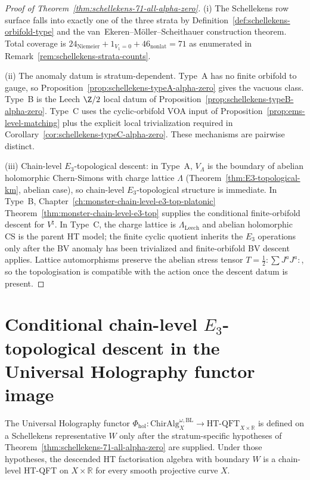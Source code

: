 \begin{proof}[Proof of Theorem~\ref{thm:schellekens-71-all-alpha-zero}]
(i) The Schellekens row surface falls into exactly one of the three
strata by Definition~\ref{def:schellekens-orbifold-type} and the
van~Ekeren--M\"oller--Scheithauer construction theorem. Total coverage is
$24_{\mathrm{Niemeier}} + 1_{V_1=0} + 46_{\mathrm{nonlat}} = 71$
as enumerated in
Remark~\ref{rem:schellekens-strata-counts}.

(ii) The anomaly datum is stratum-dependent. Type~A has no finite
orbifold to gauge, so Proposition~\ref{prop:schellekens-typeA-alpha-zero}
gives the vacuous class. Type~B is the Leech $\Z/2$ local datum of
Proposition~\ref{prop:schellekens-typeB-alpha-zero}. Type~C uses the
cyclic-orbifold VOA input of Proposition~\ref{prop:ems-level-matching}
plus the explicit local trivialization required in
Corollary~\ref{cor:schellekens-typeC-alpha-zero}. These mechanisms are
pairwise distinct.

(iii) Chain-level $E_3$-topological descent: in Type~A, $V_\Lambda$ is
the boundary of abelian holomorphic Chern-Simons with charge lattice
$\Lambda$ (Theorem~\ref*{thm:E3-topological-km}, abelian case),
so chain-level $E_3$-topological structure is immediate. In Type~B,
Chapter~\ref*{ch:monster-chain-level-e3-top-platonic}
Theorem~\ref*{thm:monster-chain-level-e3-top} supplies the conditional
finite-orbifold descent for $V^\natural$. In Type~C, the charge
lattice is $\Lambda_{\mathrm{Leech}}$ and abelian holomorphic CS is
the parent HT model; the finite cyclic quotient inherits the
$E_3$ operations only after the BV anomaly has been trivialized and
finite-orbifold BV descent applies. Lattice automorphisms preserve the
abelian stress tensor $T = \frac{1}{2} :\sum J^a J^a:$, so the
topologisation is compatible with the action once the descent datum is
present.
\end{proof}

\section{Conditional chain-level $E_3$-topological descent in the Universal
Holography functor image}
\label{sec:schellekens-e3-uhf-image}

\begin{corollary}
\label{cor:schellekens-71-uhf-image}
The Universal Holography functor
$\Phi_{\mathrm{hol}}\colon \mathrm{ChirAlg}^{\omega,\mathrm{BL}}_X
\to \mathrm{HT\text{-}QFT}_{X \times \mathbb{R}}$
is defined on a Schellekens representative $W$ only after the
stratum-specific hypotheses of
Theorem~\ref{thm:schellekens-71-all-alpha-zero} are supplied. Under
those hypotheses, the descended HT factorisation algebra with boundary
$W$ is a chain-level HT-QFT on $X \times \mathbb{R}$ for every smooth
projective curve $X$.
\end{corollary}

